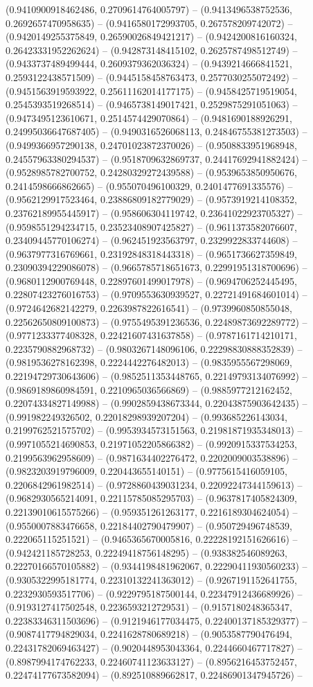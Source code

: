 (0.9410900918462486, 0.2709614764005797) -- (0.9413496538752536, 0.2692657470958635) -- (0.9416580172993705, 0.267578209742072) -- (0.9420149255375849, 0.26590026849421217) -- (0.9424200816160324, 0.26423331952262624) -- (0.942873148415102, 0.2625787498512749) -- (0.9433737489499444, 0.2609379362036324) -- (0.9439214666841521, 0.2593122438571509) -- (0.9445158458763473, 0.2577030255072492) -- (0.9451563919593922, 0.25611162014177175) -- (0.9458425719519054, 0.2545393519268514) -- (0.9465738149017421, 0.2529875291051063) -- (0.9473495123610671, 0.2514574429070864) -- (0.9481690188926291, 0.24995036647687405) -- (0.9490316526068113, 0.24846755381273503) -- (0.9499366957290138, 0.24701023872370026) -- (0.9508833951968948, 0.24557963380294537) -- (0.9518709632869737, 0.24417692941882424) -- (0.9528985782700752, 0.24280329272439588) -- (0.9539653850950676, 0.2414598666862665) -- (0.955070496100329, 0.2401477691335576) -- (0.9562129917523464, 0.23886809182779029) -- (0.9573919214108352, 0.23762189955445917) -- (0.958606304119742, 0.23641022923705327) -- (0.9598551294234715, 0.23523408907425827) -- (0.9611373582076607, 0.23409445770106274) -- (0.962451923563797, 0.2329922833744608) -- (0.9637977316769661, 0.23192848318443318) -- (0.9651736627359849, 0.23090394229086078) -- (0.9665785718651673, 0.22991951318700696) -- (0.9680112900769448, 0.22897601499017978) -- (0.9694706252445495, 0.22807423276016753) -- (0.9709553630939527, 0.22721491684601014) -- (0.9724642682142279, 0.2263987822616541) -- (0.9739960850855048, 0.22562650809100873) -- (0.9755495391236536, 0.22489873692289772) -- (0.9771233377408328, 0.22421607431637858) -- (0.9787161714210171, 0.2235790882968732) -- (0.9803267148096106, 0.22298830888352839) -- (0.9819536278162398, 0.2224442276482013) -- (0.9835955567298069, 0.22194729730643606) -- (0.9852511353448765, 0.22149793134076992) -- (0.9869189860984591, 0.2210965036566869) -- (0.9885977212162452, 0.22074334827149988) -- (0.9902859438673344, 0.22043875903642435) -- (0.991982249326502, 0.22018298939207204) -- (0.993685226143034, 0.2199762521575702) -- (0.9953934573151563, 0.21981871935348013) -- (0.9971055214690853, 0.21971052205866382) -- (0.9920915337534253, 0.2199563962958609) -- (0.9871634402276472, 0.2202009003538896) -- (0.9823203919796009, 0.220443655140151) -- (0.9775615416059105, 0.2206842961982514) -- (0.9728860439031234, 0.22092247344159613) -- (0.9682930565214091, 0.22115785085295703) -- (0.9637817405824309, 0.22139010615575266) -- (0.959351261263177, 0.2216189304624054) -- (0.9550007883476658, 0.22184402790479907) -- (0.950729496748539, 0.222065115251521) -- (0.9465365670005816, 0.22228192151626616) -- (0.942421185728253, 0.22249418756148295) -- (0.938382546089263, 0.22270166570105882) -- (0.9344198481962067, 0.22290411930560233) -- (0.9305322995181774, 0.22310132241363012) -- (0.9267191152641755, 0.2232930593517706) -- (0.9229795187500144, 0.22347912436689926) -- (0.9193127417502548, 0.2236593212729531) -- (0.9157180248365347, 0.22383346311503696) -- (0.9121946177034475, 0.22400137185329377) -- (0.9087417794829034, 0.2241628780689218) -- (0.9053587790476494, 0.22431782069463427) -- (0.9020448953043364, 0.2244660467717827) -- (0.8987994174762233, 0.22460741123633127) -- (0.8956216453752457, 0.22474177673582094) -- (0.892510889662817, 0.22486901347945726) -- 